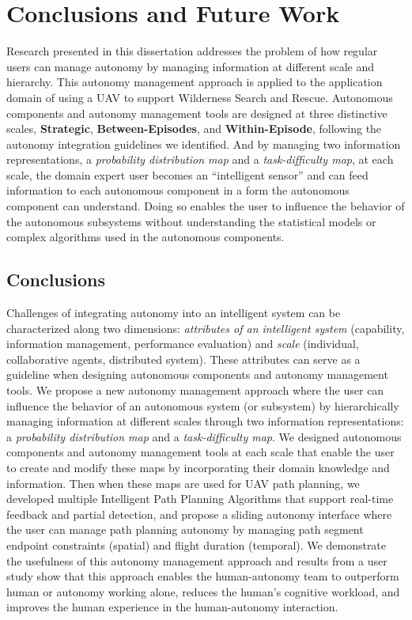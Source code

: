\chapter[Conclusions and Future Work]{Conclusions and Future Work}
\label{chap:Conclusions}

Research presented in this dissertation addresses the problem of how regular users can manage autonomy by managing information at different scale and hierarchy. This autonomy management approach is applied to the application domain of using a UAV to support Wilderness Search and Rescue. Autonomous components and autonomy management tools are designed at three distinctive scales, \textbf{Strategic}, \textbf{Between-Episodes}, and \textbf{Within-Episode}, following the autonomy integration guidelines we identified. And by managing two information representations, a \textit{probability distribution map} and a \textit{task-difficulty map}, at each scale, the domain expert user becomes an ``intelligent sensor'' and can feed information to each autonomous component in a form the autonomous component can understand. Doing so enables the user to influence the behavior of the autonomous subsystems without understanding the statistical models or complex algorithms used in the autonomous components.

\section{Conclusions}
\label{conclusions}

Challenges of integrating autonomy into an intelligent system can be characterized along two dimensions: \textit{attributes of an intelligent system} (capability, information management, performance evaluation) and \textit{scale} (individual, collaborative agents, distributed system). These attributes can serve as a guideline when designing autonomous components and autonomy management tools. We propose a new autonomy management approach where the user can influence the behavior of an autonomous system (or subsystem) by hierarchically managing information at different scales through two information representations:  a \textit{probability distribution map} and a \textit{task-difficulty map}. We designed autonomous components and autonomy management tools at each scale that enable the user to create and modify these maps by incorporating their domain knowledge and information. Then when these maps are used for UAV path planning, we developed multiple Intelligent Path Planning Algorithms that support real-time feedback and partial detection, and propose a sliding autonomy interface where the user can manage path planning autonomy by managing path segment endpoint constraints (spatial) and flight duration (temporal). We demonstrate the usefulness of this autonomy management approach and results from a user study show that this approach enables the human-autonomy team to outperform human or autonomy working alone, reduces the human's cognitive workload, and improves the human experience in the human-autonomy interaction.

